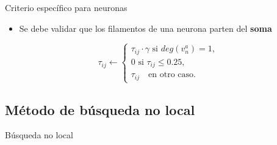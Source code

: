 \begin{frame}{Criterio espec\'ifico para neuronas}
    \begin{itemize}
        \item Se debe validar que los filamentos de una neurona parten del {\bf soma}
    \end{itemize}
    \begin{equation}
    \tau_{ij} \leftarrow
        \begin{cases}
         \tau_{ij} \cdot \gamma \text{ si } deg(v^{a}_{n}) = 1,  \\[3ex]
        
        \text{0 si } \tau_{ij} \leq 0.25, \\[3ex]
        \tau_{ij} \quad \text{en otro caso}.
        \end{cases}
    \label{eq:antiPheroSAP_neuron}
\end{equation}
\end{frame}


\subsection{M\'etodo de b\'usqueda no local}
\begin{frame}{B\'usqueda no local}
    
\end{frame}

